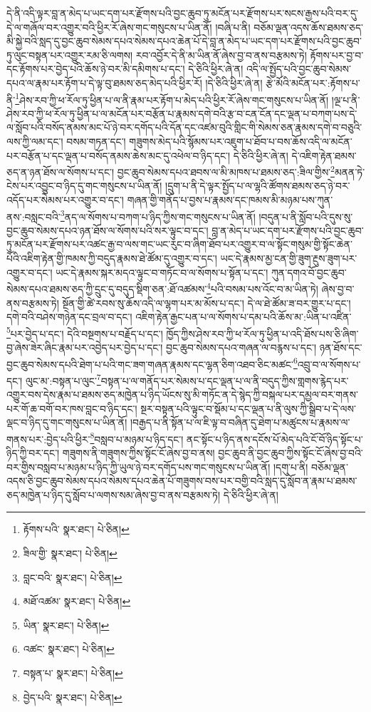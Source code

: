 དེ་ནི་འདི་ལྟར་བླ་ན་མེད་པ་ཡང་དག་པར་རྫོགས་པའི་བྱང་ཆུབ་ཏུ་མངོན་པར་རྫོགས་པར་སངས་རྒྱས་པའི་བར་དུ་དེ་ལ་གཞོལ་བར་འགྱུར་བའི་ཕྱིར་རོ་ཞེས་གང་གསུངས་པ་ཡིན་ནོ། །བཞི་པ་ནི། བཅོམ་ལྡན་འདས་ཆོས་ཐམས་ཅད་མི་སྐྱེ་བའི་སླད་དུ་བྱང་ཆུབ་སེམས་དཔའ་སེམས་དཔའ་ཆེན་པོ་དེ་བླ་ན་མེད་པ་ཡང་དག་པར་རྫོགས་པའི་བྱང་ཆུབ་ཏུ་ལུང་བསྟན་པར་འགྱུར་རམ་ཅི་ལགས། རབ་འབྱོར་དེ་ནི་མ་ཡིན་ནོ་ཞེས་བྱ་བ་ནས་བརྩམས་ཏེ། རྟོགས་པར་བྱ་བ་དང་རྟོགས་པར་བྱེད་པའི་ཆོས་ཉེ་བར་མི་དམིགས་པ་དང་། དེ་ཅིའི་ཕྱིར་ཞེ་ན། འདི་ལ་སྤྱོད་པའི་བྱང་ཆུབ་སེམས་དཔའ་ལ་རྣམ་པར་རྟོག་པ་དེ་ལྟ་བུ་ཐམས་ཅད་མེད་པའི་ཕྱིར་རོ། །དེ་ཅིའི་ཕྱིར་ཞེ་ན། རྩེ་མོའི་མངོན་པར་:རྟོགས་པ་ནི་\footnote{རྟོགས་པའི་  སྣར་ཐང་།  པེ་ཅིན། }ཤེས་རབ་ཀྱི་ཕ་རོལ་ཏུ་ཕྱིན་པ་ལ་ནི་རྣམ་པར་རྟོག་པ་མེད་པའི་ཕྱིར་རོ་ཞེས་གང་གསུངས་པ་ཡིན་ནོ། །ལྔ་པ་ནི་ཤེས་རབ་ཀྱི་ཕ་རོལ་ཏུ་ཕྱིན་པ་ལ་མངོན་པར་བརྩོན་པ་རྣམས་དགེ་བའི་རྩ་བ་ངན་ངོན་དང་ལྡན་པ་བཀག་པས་དེ་ལ་སློབ་པའི་བསོད་ནམས་མང་པོ་ཉེ་བར་དགོད་པའི་དོན་དང་འཛམ་བུའི་གླིང་གི་སེམས་ཅན་རྣམས་དགེ་བ་བཅུའི་ལས་ཀྱི་ལམ་དང་། བསམ་གཏན་དང་། གཟུགས་མེད་པའི་སྙོམས་པར་འཇུག་པ་ཐོབ་པ་བས་ཆོས་འདི་ལ་མངོན་པར་བརྩོན་པ་དང་ལྡན་པ་བསོད་ནམས་ཆེས་མང་དུ་འཕེལ་བ་ཉིད་དང་། དེ་ཅིའི་ཕྱིར་ཞེ་ན། དེ་འཇིག་རྟེན་ཐམས་ཅད་ན་ཉན་ཐོས་ལ་སོགས་པ་དང་། བྱང་ཆུབ་སེམས་དཔའ་ཐབས་ལ་མི་མཁས་པ་ཐམས་ཅད་:ཟིལ་གྱིས་\footnote{ཟིལ་གྱི་  སྣར་ཐང་།  པེ་ཅིན། }མནན་ཏེ་ངེས་པར་འབྱུང་བ་ཉིད་དུ་གང་གསུངས་པ་ཡིན་ནོ། །དྲུག་པ་ནི་དེ་ལྟར་སྤྱོད་པ་ལ་ལྷའི་ཚོགས་ཐམས་ཅད་ཉེ་བར་འདོད་པར་སེམས་པར་འགྱུར་བ་དང་། གཞན་གྱི་གནོད་པ་བྱས་པ་རྣམས་དང་ཁམས་མི་མཉམ་པས་ཀུན་ནས་:བསླང་བའི་\footnote{བླང་བའི་  སྣར་ཐང་།  པེ་ཅིན། }ནད་ལ་སོགས་པ་བཀག་པ་ཉིད་ཀྱིས་གང་གསུངས་པ་ཡིན་ནོ། །བདུན་པ་ནི་སློབ་པའི་དུས་སུ་བྱང་ཆུབ་སེམས་དཔའ་ཉན་ཐོས་ལ་སོགས་པའི་སར་ལྟུང་བ་དང་། བླ་ན་མེད་པ་ཡང་དག་པར་རྫོགས་པའི་བྱང་ཆུབ་ཏུ་མངོན་པར་རྫོགས་པར་འཚང་རྒྱ་བ་ལས་གང་ཡང་རུང་བ་ཞིག་ཐོབ་པར་འགྱུར་བ་ལ་སྟོང་གསུམ་གྱི་སྟོང་ཆེན་པོའི་འཇིག་རྟེན་གྱི་ཁམས་ཀྱི་བདུད་རྣམས་ཐེ་ཚོམ་དུ་འགྱུར་བ་དང་། ཡང་དེ་རྣམས་མྱ་ངན་གྱི་ཟུག་རྔུས་ཟུག་པར་འགྱུར་བ་དང་། ཡང་དེ་རྣམས་སྐར་མདའ་ལྟུང་བ་གཏོང་བ་ལ་སོགས་པ་སྟོན་པ་དང་། ཀུན་དགའ་བོ་བྱང་ཆུབ་སེམས་དཔའ་ཐམས་ཅད་ཀྱི་དྲུང་དུ་བདུད་སྡིག་ཅན་:ཐོ་འཚམས་\footnote{མཐོ་འཚམ་  སྣར་ཐང་།  པེ་ཅིན། }པའི་བསམ་པས་འོང་བ་མ་ཡིན་ཏེ། ཞེས་བྱ་བ་ནས་བརྩམས་ཏེ། སྔོན་གྱི་ཚེ་རབས་སུ་ཆོས་འདི་ལ་ལྷག་པར་མ་མོས་པ་དང་། དེ་ལ་ཐེ་ཚོམ་ཟ་བར་གྱུར་པ་དང་། དགེ་བའི་བཤེས་གཉེན་དང་བྲལ་བ་དང་། འཇིག་རྟེན་རྒྱང་པན་པ་ལ་སོགས་པ་དམ་པའི་ཆོས་མ་:ཡིན་པ་འཛིན་\footnote{ཡིན་  སྣར་ཐང་།  པེ་ཅིན། }པར་བྱེད་པ་དང་། དེའི་བསྔགས་པ་བརྗོད་པ་དང་། ཁྱོད་ཀྱིས་ཤེས་རབ་ཀྱི་ཕ་རོལ་ཏུ་ཕྱིན་པ་འདི་ཐོས་པས་ཅི་ཞིག་བྱ་ཞེས་ཟེར་ཞིང་རྣམ་པར་འབྱེད་པར་བྱེད་པ་དང་། བྱང་ཆུབ་སེམས་དཔའ་གཞན་ལ་བརྙས་པ་དང་། ཉན་ཐོས་དང་བྱང་ཆུབ་སེམས་དཔའི་ཐེག་པ་པའི་གང་ཟག་གཞན་རྣམས་དང་ལྷན་ཅིག་འཐབ་ཅིང་མཚང་\footnote{འཚང་  སྣར་ཐང་།  པེ་ཅིན། }འབྲུ་བ་ལ་སོགས་པ་དང་། ལུང་མ་:བསྟན་པ་ལུང་\footnote{བསྟན་པ་  སྣར་ཐང་།  པེ་ཅིན། }བསྟན་པ་ལ་གནོད་པར་སེམས་པ་དང་ལྡན་པ་ལ་ནི་བདུད་ཀྱིས་གླགས་རྙེད་པར་འགྱུར་བས་དེས་རྣམ་པ་ཐམས་ཅད་མཁྱེན་པ་ཉིད་ཡོངས་སུ་མི་གཏོང་ན་དེ་སྙེད་ཀྱི་བསྐལ་པར་དམྱལ་བར་གནས་པར་གོ་ཆ་བགོ་བར་ཁས་བླང་བ་ཉིད་དང་། སྔར་བསྟན་པའི་ལྟུང་བ་སྡོམ་པ་དང་ལྡན་པ་ནི་ལུས་ཀྱི་སྒྲིབ་པ་དེ་ལས་ལྡང་བ་ཉིད་དུ་གང་གསུངས་པ་ཡིན་ནོ། །བརྒྱད་པ་ནི་སྟོན་པ་ལ་ཇི་ལྟ་བ་བཞིན་དུ་ཐེག་པ་མཚུངས་པ་རྣམས་ལ་གནས་པར་:བྱེད་པའི་ཕྱིར་\footnote{བྱེད་པའི་  སྣར་ཐང་།  པེ་ཅིན། }བསླབ་པ་མཉམ་པ་ཉིད་དང་། ནང་སྟོང་པ་ཉིད་ནས་དངོས་པོ་མེད་པའི་ངོ་བོ་ཉིད་སྟོང་པ་ཉིད་ཀྱི་བར་དང་། གཟུགས་ནི་གཟུགས་ཀྱིས་སྟོང་ངོ་ཞེས་བྱ་བ་ནས། བྱང་ཆུབ་ནི་བྱང་ཆུབ་ཀྱིས་སྟོང་ངོ་ཞེས་བྱ་བའི་བར་གྱིས་བསླབ་པ་མཉམ་པ་ཉིད་ཀྱི་ཡུལ་ཉེ་བར་དགོད་པས་གང་གསུངས་པ་ཡིན་ནོ། །དགུ་པ་ནི། བཅོམ་ལྡན་འདས་ཅི་བྱང་ཆུབ་སེམས་དཔའ་སེམས་དཔའ་ཆེན་པོ་གཟུགས་བས་པར་བགྱི་བའི་སླད་དུ་སློབ་ན་རྣམ་པ་ཐམས་ཅད་མཁྱེན་པ་ཉིད་དུ་སློབ་པ་ལགས་སམ་ཞེས་བྱ་བ་ནས་བརྩམས་ཏེ། དེ་ཅིའི་ཕྱིར་ཞེ་ན། 